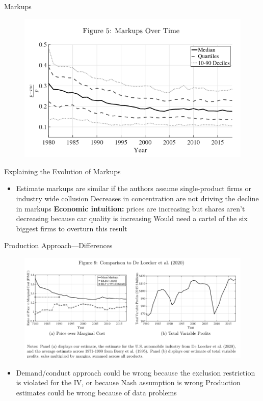 \documentclass{beamer}
\begin{document}
\begin{frame}{Markups}
  \begin{figure}[htp]
    \centering
    \includegraphics[width=\textwidth, keepaspectratio=true]{fig5.png}
  \end{figure}
\end{frame}
%
\begin{frame}{Explaining the Evolution of Markups}
  \begin{itemize}
  \item Estimate markups are similar if the authors assume single-product firms or industry wide collusion
    \vitem Decreases in concentration are not driving the decline in markups
    \vitem \textbf{Economic intuition:} prices are increasing but shares aren't decreasing because car quality is increasing
    \vitem {} Would need a cartel of the six biggest firms to overturn this result
  \end{itemize}
\end{frame}
%
\begin{frame}{Production Approach---Differences}
  \begin{figure}[htp]
    \centering
    \includegraphics[width=\textwidth, keepaspectratio=true]{fig9.png}
  \end{figure}
  \begin{itemize}
  \item Demand/conduct approach could be wrong because the exclusion restriction is violated for the IV, or because Nash assumption is wrong
    \vitem Production estimates could be wrong because of data problems
  \end{itemize}
\end{frame}
\end{document}
